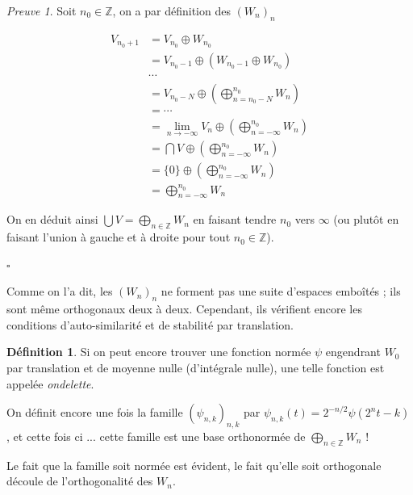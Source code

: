 \documentclass[]{article}
\theoremstyle{remark}
\newtheorem{myproof}{Preuve}
\theoremstyle{definition}
\newtheorem{mydef}{Définition}
\newcommand{\cqfd}{
	\hfill$\square$
}
\newcommand{\DS}{\displaystyle}
\begin{document}
	\begin{myproof}
		Soit $n_0 \in \mathbb{Z}$, on a par définition des $(W_{n})_n$
		
		\begin{align*}
			V_{n_0+1} &= V_{n_0} \oplus W_{n_0} \\
			&= V_{n_0 - 1} \oplus \left(W_{n_0 - 1} \oplus W_{n_0} \right) \\
			& \cdots \\
			&= V_{n_0 - N} \oplus \left(\bigoplus_{n = n_0 - N}^{n_0} W_n \right) \\
			&= \cdots \\
			&= \lim\limits_{n \to -\infty} V_n \oplus \left(\bigoplus_{n = - \infty}^{n_0} W_n \right) \\
			&= \bigcap V \oplus \left(\bigoplus_{n = - \infty}^{n_0} W_n \right) \\
			&= \{0\} \oplus \left(\bigoplus_{n = - \infty}^{n_0} W_n \right) \\
			&= \bigoplus_{n = - \infty}^{n_0} W_n
		\end{align*}
		
		On en déduit ainsi $\DS \bigcup V = \bigoplus_{n \in \mathbb{Z}} W_n$ en faisant tendre $n_0$ vers $\infty$ (ou plutôt en faisant l'union à gauche et à droite pour tout $n_0 \in \mathbb{Z}$).
		
		\cqfd
	\end{myproof}
	
	Comme on l'a dit, les $(W_n)_n$ ne forment pas une suite d'espaces emboîtés ; ils sont même orthogonaux deux à deux. Cependant, ils vérifient encore les conditions d'auto-similarité et de stabilité par translation.

	\begin{mydef}
		Si on peut encore trouver une fonction normée $\psi$ engendrant $W_0$ par translation et de moyenne nulle (d'intégrale nulle), une telle fonction est appelée \textit{ondelette}.
	\end{mydef}
	
	On définit encore une fois la famille $(\psi_{n, k})_{n, k}$ par $\psi_{n, k}(t) = 2^{-n/2} \psi(2^{n} t - k)$, et cette fois ci ... cette famille est une base orthonormée de $\DS \bigoplus_{n \in \mathbb{Z}} W_n$ !
	
	Le fait que la famille soit normée est évident, le fait qu'elle soit orthogonale découle de l'orthogonalité des $W_n$.
	
\end{document}
